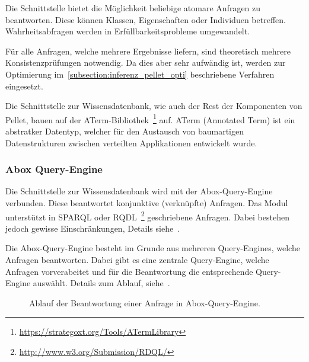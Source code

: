 Die Schnittstelle bietet die Möglichkeit beliebige atomare Anfragen zu beantworten. Diese können Klassen, Eigenschaften oder Individuen betreffen. Wahrheitsabfragen werden in Erfüllbarkeitsprobleme umgewandelt.

Für alle Anfragen, welche mehrere Ergebnisse liefern, sind theoretisch mehrere Konsistenzprüfungen notwendig. Da dies aber sehr aufwändig ist, werden zur Optimierung im~\autoref{subsection:inferenz_pellet_opti} beschriebene Verfahren eingesetzt.

Die Schnittstelle zur Wissensdatenbank, wie auch der Rest der Komponenten von Pellet, bauen auf der ATerm-Bibliothek~\footnote{\url{https://strategoxt.org/Tools/ATermLibrary}} auf. ATerm (Annotated Term) ist ein abstratker Datentyp, welcher für den Austausch von baumartigen Datenstrukturen zwischen verteilten Applikationen entwickelt wurde.

\subsubsection{Abox Query-Engine}
\label{ssubsection:inferenz_pellet_aboxquery}
Die Schnittstelle zur Wissensdatenbank wird mit der Abox-Query-Engine verbunden. Diese beantwortet konjunktive (verknüpfte) Anfragen. Das Modul unterstützt in SPARQL oder RQDL~\footnote{\url{http://www.w3.org/Submission/RDQL/}} geschriebene Anfragen. Dabei bestehen jedoch gewisse Einschränkungen, Details siehe~\cite[Seiten 10 und 11]{sirin:pellet05}.

Die Abox-Query-Engine besteht im Grunde aus mehreren Query-Engines, welche Anfragen beantworten. Dabei gibt es eine zentrale Query-Engine, welche Anfragen vorverabeitet und für die Beantwortung die entsprechende Query-Engine auswählt. Details zum Ablauf, siehe~\cite[Seite 11]{sirin:pellet05}.

\begin{figure}[htbp]
    \centering {}
    \caption{Ablauf der Beantwortung einer Anfrage in Abox-Query-Engine.\label{fig:pellet_queryengine_komponenten}\protect\footnotemark}
\end{figure}

